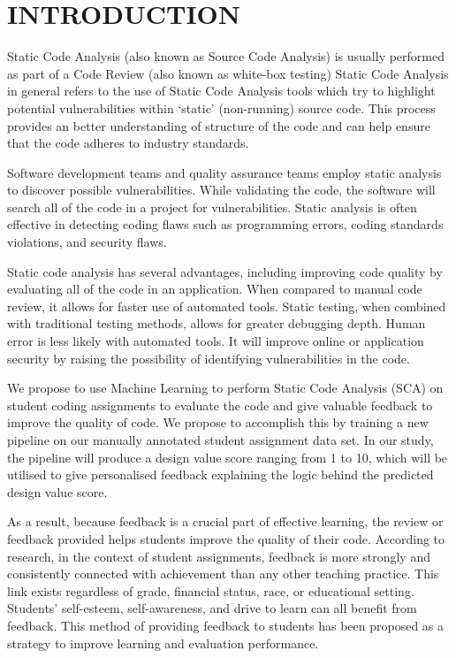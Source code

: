 
\chapter{INTRODUCTION} %
Static Code Analysis (also known as Source Code Analysis) is usually performed as part of a Code Review (also known as white-box testing) Static Code Analysis in general refers to the use of Static Code Analysis tools which try to highlight potential vulnerabilities within ‘static’ (non-running) source code. This process provides an better understanding of structure of the code and can help ensure that the code adheres to industry standards. 

Software development teams and quality assurance teams employ static analysis to discover possible vulnerabilities.  While validating the code, the software will search all of the code in a project for vulnerabilities. Static analysis is often effective in detecting coding flaws such as programming errors, coding standards violations, and security flaws.

Static code analysis has several advantages, including improving code quality by evaluating all of the code in an application. When compared to manual code review, it allows for faster use of automated tools. Static testing, when combined with traditional testing methods, allows for greater debugging depth. Human error is less likely with automated tools. It will improve online or application security by raising the possibility of identifying vulnerabilities in the code.

We propose to use Machine Learning to perform Static Code Analysis (SCA) on student coding assignments to evaluate the code and give valuable feedback to improve the quality of code. We propose to accomplish this by training a new pipeline on our manually annotated student assignment data set. In our study, the pipeline will produce a design value score ranging from 1 to 10, which will be utilised to give personalised feedback explaining the logic behind the predicted design value score.

As a result, because feedback is a crucial part of effective learning, the review or feedback provided helps students improve the quality of their code. According to research, in the context of student assignments, feedback is more strongly and consistently connected with achievement than any other teaching practice. This link exists regardless of grade, financial status, race, or educational setting. Students' self-esteem, self-awareness, and drive to learn can all benefit from feedback. This method of providing feedback to students has been proposed as a strategy to improve learning and evaluation performance.